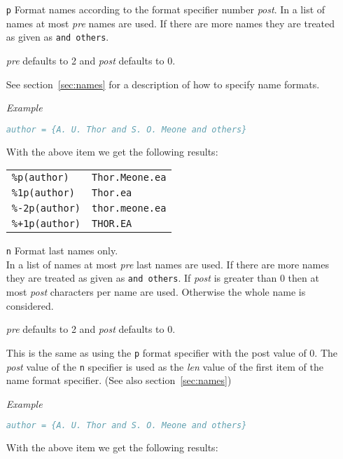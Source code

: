 \documentclass[11pt,a4paper]{scrbook}
\newenvironment{Example}{\smallskip\par\textit{Example}\par}{\smallskip\par}
\begin{document}
\begin{itemize}
  \item [\texttt{p}] Format names according to the format
    specifier number \textit{post}. In a list of names at most \textit{pre}
    names are used. If there are more names they are treated as given as
    \texttt{and others}.

    \textit{pre} defaults to 2 and \textit{post} defaults to 0.

    See section~\ref{sec:names} for a description of how to specify name
    formats.

    \begin{Example}
      \begin{lstlisting}[language=BibTeX]
  author = {A. U. Thor and S. O. Meone and others}
      \end{lstlisting}\vspace{-2ex}
      With the above item we get the following results:

      \begin{tabular}{ll}
        \texttt{\%p(author)}	& \texttt{Thor.Meone.ea}	\\
        \texttt{\%1p(author)}	& \texttt{Thor.ea}		\\
        \texttt{\%-2p(author)}	& \texttt{thor.meone.ea}	\\
        \texttt{\%+1p(author)}	& \texttt{THOR.EA}		
      \end{tabular}
    \end{Example}

  \item [\texttt{n}] Format last names only.\\
    In a list of names at most \textit{pre} last names are used. If there are
    more names they are treated as given as \texttt{and others}. If
    \textit{post} is greater than 0 then at most \textit{post} characters per
    name are used. Otherwise the whole name is considered.

    \textit{pre} defaults to 2 and \textit{post} defaults to 0.

    This is the same as using the \texttt{p} format specifier with the post
    value of 0. The \textit{post} value of the \texttt{n} specifier is used as
    the \textit{len} value of the first item of the name format specifier.
    (See also section~\ref{sec:names})

    \begin{Example}
      \begin{lstlisting}[language=BibTeX]
  author = {A. U. Thor and S. O. Meone and others}
      \end{lstlisting}\vspace{-2ex}
      With the above item we get the following results:


\end{Example}
\end{itemize}
\end{document}
